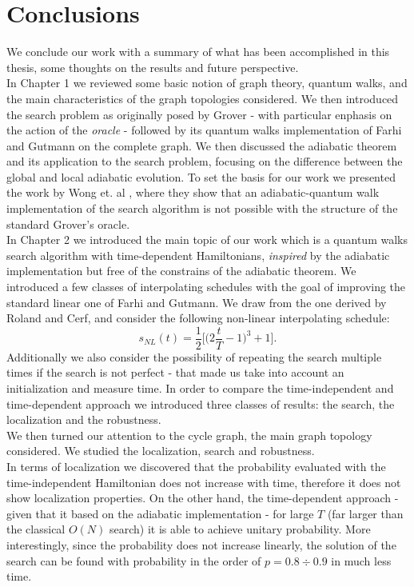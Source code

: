 \newpage


\chapter*{\textbf{Conclusions}}

\vspace{-1cm}
We conclude our work with a summary of what has been accomplished in this thesis, some thoughts on the results and future perspective. \\

In Chapter 1 we reviewed some basic notion of graph theory, quantum walks, and the main characteristics of the graph topologies considered. We then introduced the search problem as originally posed by Grover - with particular enphasis on the action of the \textit{oracle} - followed by its quantum walks implementation of Farhi and Gutmann on the complete graph. We then discussed the adiabatic theorem and its application to the search problem, focusing on the difference between the global and local adiabatic evolution. To set the basis for our work we presented the work by Wong et. al \cite{Wong2016}, where they show that an adiabatic-quantum walk implementation of the search algorithm is not possible with the structure of the standard Grover's oracle. \\

In Chapter 2 we introduced the main topic of our work which is a quantum walks search algorithm with time-dependent Hamiltonians, \textit{inspired} by the adiabatic implementation but free of the constrains of the adiabatic theorem. We introduced a few classes of interpolating schedules with the goal of improving the standard linear one of Farhi and Gutmann. We draw from the one derived by Roland and Cerf, and consider the following non-linear interpolating schedule:
\begin{equation*}
  s_{NL}(t)  = \frac{1}{2}\Big[\big(2\frac{t}{T} - 1\big)^3 +1\Big].
\end{equation*}
Additionally we also consider the possibility of repeating the search multiple times if the search is not perfect - that made us take into account an initialization and measure time. In order to compare the time-independent and time-dependent approach we introduced three classes of results: the search, the localization and the robustness. \\

We then turned our attention to the cycle graph, the main graph topology considered. We studied the localization, search and robustness. \\
In terms of localization we discovered that the probability evaluated with the time-independent Hamiltonian does not increase with time, therefore it does not show localization properties. On the other hand, the time-dependent approach - given that it based on the adiabatic implementation - for large $T$ (far larger than the classical $O(N)$ search) it is able to achieve unitary probability. More interestingly, since the probability does not increase linearly, the solution of the search can be found with probability in the order of $p=0.8\div 0.9$ in much less time. \\

